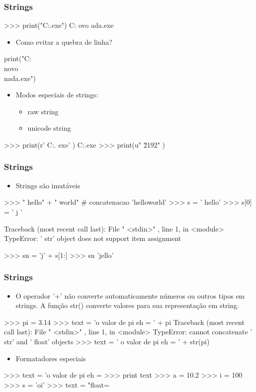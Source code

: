 \documentclass[12pt,t,graphics]{beamer}
\newcommand{\ft}[1]{\frametitle{#1}}
\newcommand{\bi}{\begin{itemize}}
\newcommand{\ei}{\end{itemize}}
\begin{document}
\begin{frame}[fragile]
  \ft{Strings}
  \begin{python}
    >>> print("C:\diretorio\novo\nada.exe")
    C:\diretorio
    ovo
    ada.exe		
  \end{python}
  \bi
\item Como evitar a quebra de linha?
  \ei
  \begin{python}
    print("C:\diretorio\\novo\\nada.exe")		
  \end{python}
  \bi
\item Modos especiais de strings:
  \bi
\item raw string
\item unicode string
  \ei
  \ei
  \begin{python}
    >>> print(r' C:\diretorio\novo\nada. exe' )
    C:\diretorio\novo\nada.exe
    >>> print(u" \u2192" )		
  \end{python}		
\end{frame}


\begin{frame}[fragile]
  \ft{Strings}
  \bi
\item Strings são imutáveis
  \ei	
  \begin{python}
    >>> " hello" + " world" # concatenacao
    'helloworld'
    >>> s = ' hello'
    >>> s[0] = ' j '

    Traceback (most recent call last):
    File " <stdin>" , line 1, in <module>
    TypeError: ' str' object does not support
    item assignment
    
    >>> sn = 'j' + s[1:]
    >>> sn
    'jello'	
  \end{python}
\end{frame}


\begin{frame}[fragile]
  \ft{Strings}
  \bi
\item O operador ’+’ não converte automaticamente
  números ou outros tipos em strings. A função
  str() converte valores para sua representação em
  string.
  \ei	
  \begin{python}
    >>> pi = 3.14
    >>> text = 'o valor de pi eh = ' + pi
    Traceback (most recent call last):
    File " <stdin>" , line 1, in <module>
    TypeError: cannot concatenate ' str' and ' float' objects
    >>> text = ' o valor de pi eh = ' + str(pi)		
  \end{python}
  \bi
\item Formatadores especiais
  \ei
  \begin{python}
    >>> text = 'o valor de pi eh = %
    >>> print text
    >>> a = 10.2
    >>> i = 100
    >>> s = 'oi'
    >>> text = "float=%
  \end{python}		
\end{frame}
\end{document}

